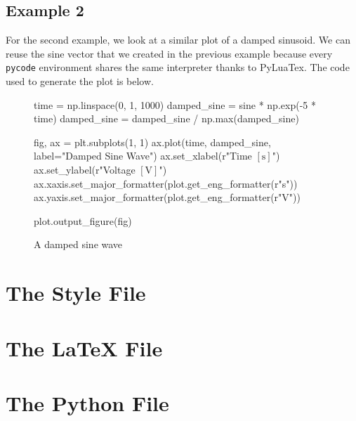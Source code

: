 \documentclass[10pt, twocolumn]{article}
\begin{document}
\subsection{Example 2}

For the second example, we look at a similar plot of a damped sinusoid. We can
reuse the sine vector that we created in the previous example because every
\texttt{pycode} environment shares the same interpreter thanks to
PyLuaTex. The code used to generate the plot is below.

\begin{figure}[!ht]
  \begin{pycode}
    time = np.linspace(0, 1, 1000)
    damped_sine = sine * np.exp(-5 * time)
    damped_sine = damped_sine / np.max(damped_sine)

    fig, ax = plt.subplots(1, 1)
    ax.plot(time, damped_sine, label="Damped Sine Wave")
    ax.set_xlabel(r"Time $\left[\mathrm{s}\right]$")
    ax.set_ylabel(r"Voltage $\left[\mathrm{V}\right]$")
    ax.xaxis.set_major_formatter(plot.get_eng_formatter(r"s"))
    ax.yaxis.set_major_formatter(plot.get_eng_formatter(r"V"))

    plot.output_figure(fig)
  \end{pycode}
  \caption{A damped sine wave}
\end{figure}

\pagebreak\onecolumn

\section{The Style File}



\section{The LaTeX File}



\section{The Python File}


\end{document}
